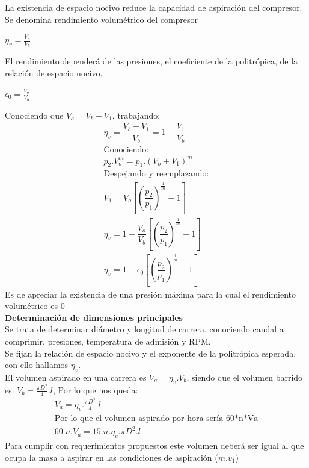 \documentclass[11pt,a4paper,twocolumn]{article}
\begin{document}
	La existencia de espacio nocivo reduce la capacidad de aspiración del compresor. Se denomina rendimiento volumétrico del compresor 
	\begin{center}
		$\eta_{v}=\frac{V_{a}}{V_{b}}$
	\end{center}
	El rendimiento dependerá de las presiones, el coeficiente de la politrópica, de la relación de espacio nocivo.
	\begin{center}
		$\epsilon_{0}=\frac{V_{o}}{V_{b}}$
	\end{center}
	Conociendo que $V_{a}=V_{b}-V_{1}$, trabajando:
	\begin{gather*}
		\eta_{v}=\dfrac{V_{b}-V_{1}}{V_{b}}=1-\dfrac{V_{1}}{V_{b}}\\
		\mbox{Conociendo:}\\
		p_{2}.V_{o}^{m}=p_{1}.\left( V_{o}+V_{1}\right) ^{m}\\
		\text{Despejando~y~reemplazando:}\\
		V_{1}=V_{o}\left[ \left( \dfrac{p_{2}}{p_{1}}\right) ^{\frac{1}{m}}-1\right] \\
		\eta_{v}=1-\dfrac{V_{o}}{V_{b}}\left[ \left( \dfrac{p_{2}}{p_{1}}\right) ^{\frac{1}{m}}-1\right]\\
		\boxed{\eta_{v}=1-\epsilon_{0}\left[ \left( \dfrac{p_{2}}{p_{1}}\right) ^{\frac{1}{m}}-1\right]}
	\end{gather*}
	Es de apreciar la existencia de una presión máxima para la cual el rendimiento volumétrico es 0\\
	\textbf{Determinación de dimensiones principales}\\
	Se trata de determinar diámetro y longitud de carrera, conociendo caudal a comprimir, presiones, temperatura de admisión y RPM.\\
	Se fijan la relación de espacio nocivo y el exponente de la politrópica esperada, con ello hallamos $\eta_{v}$.\\
	El volumen aspirado en una carrera es $V_{a}=\eta_{v}.V_{b}$, siendo que el volumen barrido es: $V_{b}=\frac{\pi D^{2}}{4}.l$, Por lo que nos queda:
	\begin{gather*}
		V_{a}=\eta_{v}.\frac{\pi D^{2}}{4}.l\\
		\text{Por lo que el volumen aspirado por hora sería 60*n*Va}\\
		60.n.V_{a}=15.n.\eta_{v}.\pi D^{2}.l
	\end{gather*}
	Para cumplir con requerimientos propuestos este volumen deberá ser igual al que ocupa la masa a aspirar en las condiciones de aspiración ($\dot{m}.v_{1}$)
\end{document}
